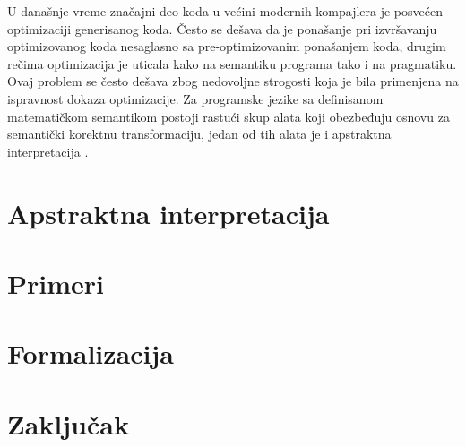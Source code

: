 \documentclass[a4paper]{article}
\begin{document}
U današnje vreme značajni deo koda u većini modernih kompajlera je posvećen optimizaciji generisanog koda. Često se dešava da je ponašanje pri izvršavanju optimizovanog koda nesaglasno sa pre-optimizovanim ponašanjem koda, drugim rečima optimizacija je uticala kako na semantiku programa tako i na pragmatiku. Ovaj problem se često dešava zbog nedovoljne strogosti koja je bila primenjena na ispravnost dokaza optimizacije. Za programske jezike sa definisanom matematičkom semantikom postoji rastući skup alata koji obezbeđuju osnovu za semantički korektnu transformaciju, jedan od tih alata je i apstraktna interpretacija \cite{AbramskyHankin}. \\



\section{Apstraktna interpretacija}
\label{sec:Apstraktna interpretacija}





\section{Primeri}
\label{sec:Primeri}


\newpage
\section{Formalizacija} 
\label{sec:Formalizacija}


\section{Zaključak}
\label{sec:zakljucak}
 


\appendix
 

\end{document}
